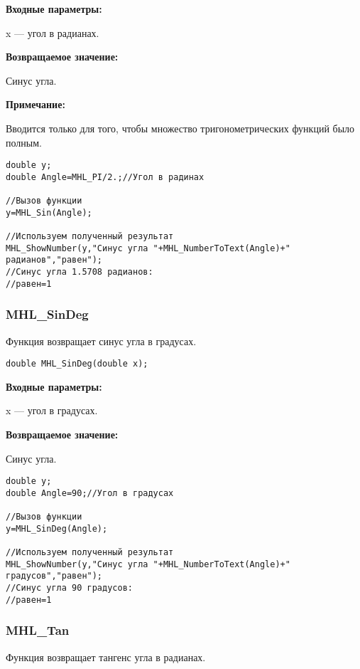 \documentclass[a4paper,12pt]{article}
\begin{document}
\textbf{Входные параметры:}

 x --- угол в радианах.

\textbf{Возвращаемое значение:}

Синус угла.

\textbf{Примечание:}

 Вводится только для того, чтобы множество тригонометрических функций было полным.


\begin{lstlisting}[label=code_use_MHL_Sin,caption=Пример использования]
double y;
double Angle=MHL_PI/2.;//Угол в радинах

//Вызов функции
y=MHL_Sin(Angle);

//Используем полученный результат
MHL_ShowNumber(y,"Синус угла "+MHL_NumberToText(Angle)+" радианов","равен");
//Синус угла 1.5708 радианов:
//равен=1
\end{lstlisting}

\subsubsection{MHL\_SinDeg}\label{MHL_SinDeg}

Функция возвращает синус угла в градусах.


\begin{lstlisting}[label=code_syntax_MHL_SinDeg,caption=Синтаксис]
double MHL_SinDeg(double x);
\end{lstlisting}

\textbf{Входные параметры:}

 x --- угол в градусах.

\textbf{Возвращаемое значение:}

Синус угла.


\begin{lstlisting}[label=code_use_MHL_SinDeg,caption=Пример использования]
double y;
double Angle=90;//Угол в градусах

//Вызов функции
y=MHL_SinDeg(Angle);

//Используем полученный результат
MHL_ShowNumber(y,"Синус угла "+MHL_NumberToText(Angle)+" градусов","равен");
//Синус угла 90 градусов:
//равен=1
\end{lstlisting}

\subsubsection{MHL\_Tan}\label{MHL_Tan}

Функция возвращает тангенс угла в радианах.
\end{document}
